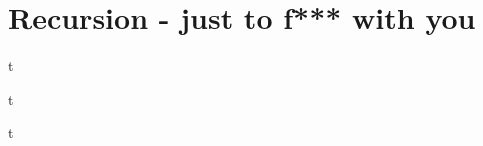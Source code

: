 \documentclass[../lecture4-functions.tex]{subfiles}
\begin{document}
\section{Recursion - just to f*** with you}


\begin{frame}[fragile]{}
t
\end{frame}


\begin{frame}[fragile]{}
t
\end{frame}


\begin{frame}[fragile]{}
t
\end{frame}

\end{document}
